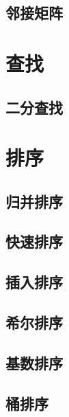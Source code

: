 \subsection{邻接矩阵}

\section{查找}
\subsection{二分查找}
\section{排序}
\subsection{归并排序}
\subsection{快速排序}
\subsection{插入排序}
\subsection{希尔排序}
\subsection{基数排序}
\subsection{桶排序}

